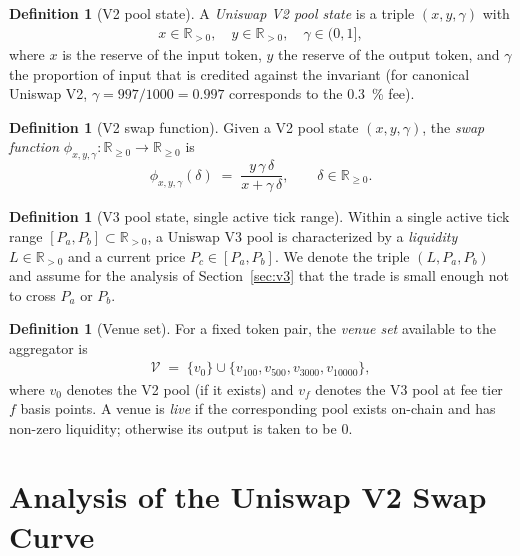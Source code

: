 \documentclass[11pt,a4paper]{article}
\theoremstyle{definition}
\newtheorem{definition}[theorem]{Definition}
\newcommand{\R}{\mathbb{R}}
\newcommand{\Rpos}{\R_{>0}}
\newcommand{\Rnn}{\R_{\geq 0}}
\begin{document}
\begin{definition}[V2 pool state]
A \emph{Uniswap V2 pool state} is a triple $(x, y, \gamma)$ with
\begin{align*}
    x \in \Rpos, \quad y \in \Rpos, \quad \gamma \in (0,1],
\end{align*}
where $x$ is the reserve of the input token, $y$ the reserve of the output token,
and $\gamma$ the proportion of input that is credited against the invariant
(for canonical Uniswap V2, $\gamma = 997/1000 = 0.997$ corresponds to the
\SI{0.3}{\percent} fee).
\end{definition}

\begin{definition}[V2 swap function]
Given a V2 pool state $(x,y,\gamma)$, the \emph{swap function}
$\phi_{x,y,\gamma} : \Rnn \to \Rnn$ is
\begin{equation}
    \phi_{x,y,\gamma}(\delta) \;=\; \frac{y \, \gamma \, \delta}{x + \gamma \, \delta},
    \qquad \delta \in \Rnn.
    \label{eq:v2-swap}
\end{equation}
\end{definition}

\begin{definition}[V3 pool state, single active tick range]
\label{def:v3-state}
Within a single active tick range $[P_a, P_b] \subset \Rpos$, a Uniswap V3 pool is
characterized by a \emph{liquidity} $L \in \Rpos$ and a current price
$P_c \in [P_a, P_b]$. We denote the triple $(L, P_a, P_b)$ and assume for the
analysis of Section~\ref{sec:v3} that the trade is small enough not to cross
$P_a$ or $P_b$.
\end{definition}

\begin{definition}[Venue set]
\label{def:venues}
For a fixed token pair, the \emph{venue set} available to the aggregator is
\begin{align*}
    \mathcal{V} \;=\; \{ v_0 \} \cup \{ v_{100}, v_{500}, v_{3000}, v_{10000} \},
\end{align*}
where $v_0$ denotes the V2 pool (if it exists) and $v_f$ denotes the V3 pool at
fee tier $f$ basis points. A venue is \emph{live} if the corresponding pool
exists on-chain and has non-zero liquidity; otherwise its output is taken to be
$0$.
\end{definition}

\section{Analysis of the Uniswap V2 Swap Curve}
\label{sec:v2}
\end{document}
